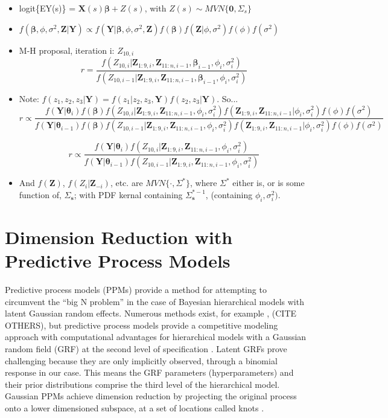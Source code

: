 \begin{itemize}
\item logit\{EY(s)\} = $\pmb{X}(s)\pmb{\beta} + Z(s)$, with $Z(s) \sim MVN\{\pmb{0}, \Sigma_{s}\}$
\item $f(\pmb{\beta}, \phi, \sigma^{2}, \pmb{Z}|\pmb{Y}) \propto f(\pmb{Y}|\pmb{\beta}, \phi, \sigma^{2}, \pmb{Z})f(\pmb{\beta})f(\pmb{Z}|\phi, \sigma^{2})f(\phi)f(\sigma^{2})$
\item M-H proposal, iteration i: $Z_{10,i}$
$$ r = \frac{ f(Z_{10,i}|\pmb{Z}_{1:9,i},\pmb{Z}_{11:n,i-1}, \pmb{\beta}_{i-1}, \phi_{i}, \sigma^{2}_{i})}{f(Z_{10,i-1}|\pmb{Z}_{1:9,i},\pmb{Z}_{11:n,i-1}, \pmb{\beta}_{i-1}, \phi_{i}, \sigma^{2}_{i})} $$
 
\item Note: $f(z_{1}, z_{2}, z_{3}|\pmb{Y}) = f(z_{1}|z_{2},z_{3},\pmb{Y})f(z_{2},z_{3}|\pmb{Y})$. So... $$r \propto \frac{f(\pmb{Y}|\pmb{\theta}_{i})f(\pmb{\beta})f(Z_{10,i}|\pmb{Z}_{1:9,i},\pmb{Z}_{11:n,i-1}, \phi_{i}, \sigma^{2}_{i})f(\pmb{Z}_{1:9,i},\pmb{Z}_{11:n,i-1}|\phi_{i}, \sigma^{2}_{i})f(\phi)f(\sigma^{2})} {f(\pmb{Y}|\pmb{\theta}_{i-1})f(\pmb{\beta})f(Z_{10,i-1}|\pmb{Z}_{1:9,i},\pmb{Z}_{11:n,i-1}, \phi_{i}, \sigma^{2}_{i})f(\pmb{Z}_{1:9,i},\pmb{Z}_{11:n,i-1}|\phi_{i}, \sigma^{2}_{i})f(\phi)f(\sigma^{2})}$$

$$ r \propto \frac{f(\pmb{Y}|\pmb{\theta}_{i})f(Z_{10,i}|\pmb{Z}_{1:9,i},\pmb{Z}_{11:n,i-1}, \phi_{i}, \sigma^{2}_{i})}
{f(\pmb{Y}|\pmb{\theta}_{i-1})f(Z_{10,i-1}|\pmb{Z}_{1:9,i},\pmb{Z}_{11:n,i-1}, \phi_{i}, \sigma^{2}_{i})} $$

\item And $f(\pmb{Z})$, $f(Z_{i}|\pmb{Z}_{-i})$, etc. are $MVN\{\cdot,\Sigma^{*}\}$, where $\Sigma^{*}$ either is, or is some function of, $\Sigma_{\pmb{s}}$; with PDF kernal containing $\Sigma_{\pmb{s}}^{*-1}$, (containing $\phi_{i}, \sigma^{2}_{i})$.

\end{itemize}

\section{Dimension Reduction with Predictive Process Models} %

Predictive process models (PPMs) provide a method for attempting to circumvent the ``big N problem'' in the case of Bayesian hierarchical models with latent Gaussian random effects. Numerous methods exist, for example \citep{Cressie2008}, (CITE OTHERS), but predictive process models provide a competitive modeling approach with computational advantages for hierarchical models with a Gaussian random field (GRF) at the second level of specification \citep{Banerjee2008}. Latent GRFs prove challenging because they are only implicitly observed, through a binomial response in our case. This means the GRF parameters (hyperparameters) and their prior distributions comprise the third level of the hierarchical model. Gaussian PPMs achieve dimension reduction by projecting the original process onto a lower dimensioned subspace, at a set of locations called knots \citep{Banerjee2008}. 

